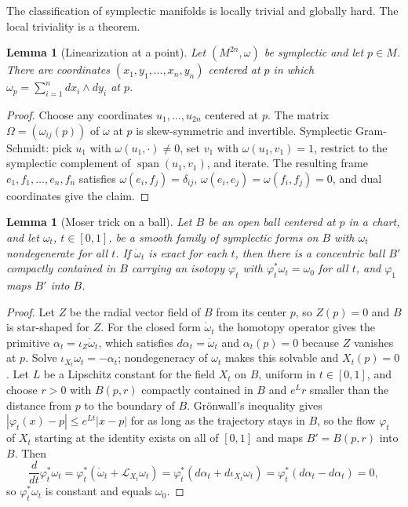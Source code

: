 \documentclass[11pt,letterpaper]{article}
\newtheorem{lemma}[theorem]{Lemma}
\theoremstyle{definition}
\theoremstyle{remark}
\begin{document}
The classification of symplectic manifolds is locally trivial and globally hard. The local triviality is a theorem.

\begin{lemma}[Linearization at a point]
\label{lem:linearization}
Let $(M^{2n}, \omega)$ be symplectic and let $p \in M$. There are coordinates $(x_1, y_1, \dots, x_n, y_n)$ centered at $p$ in which $\omega_p = \sum_{i=1}^{n} dx_i \wedge dy_i$ at $p$.
\end{lemma}

\begin{proof}
Choose any coordinates $u_1, \dots, u_{2n}$ centered at $p$. The matrix $\Omega = (\omega_{ij}(p))$ of $\omega$ at $p$ is skew-symmetric and invertible. Symplectic Gram-Schmidt: pick $u_1$ with $\omega(u_1, \cdot) \neq 0$, set $v_1$ with $\omega(u_1, v_1) = 1$, restrict to the symplectic complement of $\operatorname{span}(u_1, v_1)$, and iterate. The resulting frame $e_1, f_1, \dots, e_n, f_n$ satisfies $\omega(e_i, f_j) = \delta_{ij}$, $\omega(e_i, e_j) = \omega(f_i, f_j) = 0$, and dual coordinates give the claim.
\end{proof}

\begin{lemma}[Moser trick on a ball]
\label{lem:moser-ball}
Let $B$ be an open ball centered at $p$ in a chart, and let $\omega_t$, $t \in [0, 1]$, be a smooth family of symplectic forms on $B$ with $\omega_t$ nondegenerate for all $t$. If $\dot{\omega}_t$ is exact for each $t$, then there is a concentric ball $B'$ compactly contained in $B$ carrying an isotopy $\varphi_t$ with $\varphi_t^{*} \omega_t = \omega_0$ for all $t$, and $\varphi_1$ maps $B'$ into $B$.
\end{lemma}

\begin{proof}
Let $Z$ be the radial vector field of $B$ from its center $p$, so $Z(p) = 0$ and $B$ is star-shaped for $Z$. For the closed form $\dot{\omega}_t$ the homotopy operator gives the primitive $\alpha_t = \iota_{Z} \dot{\omega}_t$, which satisfies $d \alpha_t = \dot{\omega}_t$ and $\alpha_t(p) = 0$ because $Z$ vanishes at $p$. Solve $\iota_{X_t} \omega_t = -\alpha_t$; nondegeneracy of $\omega_t$ makes this solvable and $X_t(p) = 0$. Let $L$ be a Lipschitz constant for the field $X_t$ on $B$, uniform in $t \in [0, 1]$, and choose $r > 0$ with $B(p, r)$ compactly contained in $B$ and $e^{L} r$ smaller than the distance from $p$ to the boundary of $B$. Grönwall's inequality gives $|\varphi_t(x) - p| \leq e^{L t} |x - p|$ for as long as the trajectory stays in $B$, so the flow $\varphi_t$ of $X_t$ starting at the identity exists on all of $[0, 1]$ and maps $B' = B(p, r)$ into $B$. Then
\[
\frac{d}{dt} \varphi_t^{*} \omega_t = \varphi_t^{*} \left( \dot{\omega}_t + \mathcal{L}_{X_t} \omega_t \right) = \varphi_t^{*} \left( d\alpha_t + d \iota_{X_t} \omega_t \right) = \varphi_t^{*} (d \alpha_t - d \alpha_t) = 0,
\]
so $\varphi_t^{*} \omega_t$ is constant and equals $\omega_0$.
\end{proof}
\end{document}
